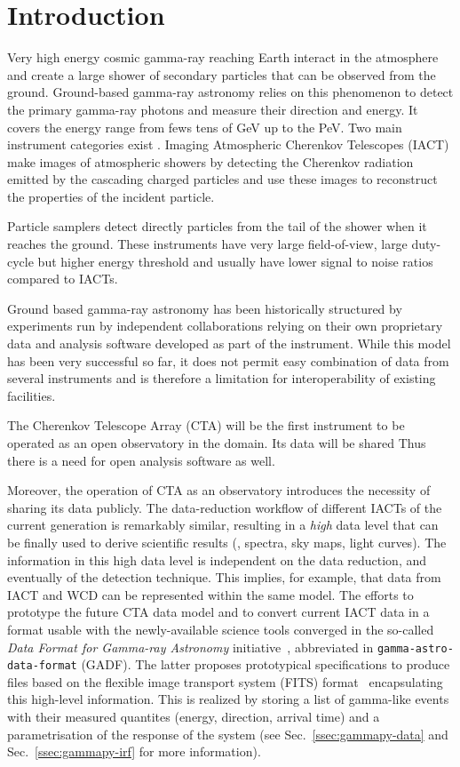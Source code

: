 \section{Introduction}
\label{sec:introduction}



Very high energy cosmic gamma-ray reaching Earth interact in the atmosphere and
create a large shower of secondary particles that can be observed from the ground.
Ground-based gamma-ray astronomy relies on this phenomenon to detect the
primary gamma-ray photons and measure their direction and energy.
It covers the energy range from fews tens of GeV up to the PeV.
Two main instrument categories exist \citep{2015CRPhy..16..610D}.
Imaging Atmospheric Cherenkov Telescopes (IACT) make images of atmospheric showers
by detecting the Cherenkov radiation emitted by the cascading charged particles and
use these images to reconstruct the properties of the incident particle.

Particle samplers detect directly particles from the tail of the shower when it reaches
the ground. These instruments have very large field-of-view, large duty-cycle but higher
energy threshold and usually have lower signal to noise ratios compared to IACTs.

Ground based gamma-ray astronomy has been historically structured
by experiments run by independent collaborations relying
on their own proprietary data and analysis software developed as part of the
instrument. While this model has been very successful so far, it does not
permit easy combination of data from several instruments and is therefore
a limitation for interoperability of existing facilities.

The Cherenkov Telescope Array (CTA) will be the first instrument to be operated
as an open observatory in the domain. Its data will be shared
Thus there is a need for open analysis software as well.

Moreover, the operation of CTA as an observatory introduces the necessity of
sharing its data publicly. The data-reduction workflow of different IACTs of
the current generation is remarkably similar, resulting in a \textit{high} data
level that can be finally used to derive scientific results (, spectra, sky
maps, light curves). The information in this high data level is independent on
the data reduction, and eventually of the detection technique. This implies,
for example, that data from IACT and WCD can be represented within the same
model. The efforts to prototype the future CTA data model and to convert
current IACT data in a format usable with the newly-available science tools
converged in the so-called \textit{Data Format for Gamma-ray Astronomy}
initiative~\citep{gadf_proc, gadf_universe}, abbreviated in
\texttt{gamma-astro-data-format} (GADF). The latter proposes prototypical
specifications to produce files based on the flexible image transport system
(FITS) format~\citep{fits} encapsulating this high-level information. This is
realized by storing a list of gamma-like events with their measured quantites
(energy, direction, arrival time) and a parametrisation of the response of the
system (see Sec.~\ref{ssec:gammapy-data} and Sec.~\ref{ssec:gammapy-irf} for
more information).

